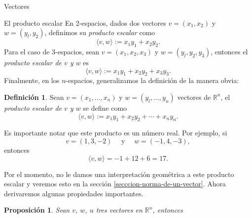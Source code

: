 \documentclass[a4paper,12pt,twoside,spanish,reqno]{amsbook}
\numberwithin{equation}{section}
\newtheorem{proposicion}[teorema]{Proposici\'on}
\theoremstyle{definition}
\newtheorem{definicion}[teorema]{Definici\'on}
\theoremstyle{remark}
\newcommand{\R}{\mathbb R}
\begin{document}
\begin{chapter}{Vectores}
\begin{section}{El producto escalar}
        En 2-espacios, dados dos vectores $v = (x_1, x_2)$ y $w= (y_l, y_2)$, definimos su \textit{producto escalar} como
        \begin{equation*}
            \langle v , w  \rangle :=x_1y_1 + x_2y_2.
        \end{equation*}
        Para el caso de 3-espacios, sean   $v = (x_1, x_2,x_3)$ y $w= (y_l, y_2,y_3)$,  entonces el \textit{producto escalar de $v$ y $w$} es
        \begin{equation*}
            \langle v , w  \rangle :=x_1y_1 + x_2y_2+x_3y_3.
        \end{equation*}
        Finalmente, en los $n$-espacios,  generalizamos la definición de la manera obvia: 
        
        \begin{definicion}
            Sean  $v = (x_1, \ldots,x_n)$ y $w= (y_l, \ldots,y_n)$ vectores de $\R^n$,  el \textit{producto escalar de $v$ y $w$} se define como		
            \begin{equation*}
            \langle v , w \rangle :=x_1y_1 + x_2y_2+\cdots+x_ny_n.
            \end{equation*}
        \end{definicion}
        
        
        
        Es importante notar  que este producto es un número real. Por ejemplo, si
        \begin{equation*}
            v= (1, 3, - 2) \quad\text{ y } \quad w= (- 1, 4, - 3),
        \end{equation*}
        entonces
        \begin{equation*}
            \langle v , w \rangle= - 1 + 12 + 6 = 17.
        \end{equation*}
        
        Por el momento, no le damos una interpretación geométrica a este producto escalar y veremos esto en la sección \ref{secccion-norma-de-un-vector}. Ahora derivaremos algunas propiedades importantes.
        
        \begin{proposicion}
           Sean $v$, $w$, $u$  tres vectores en $\R^n$, entonces
     

\end{proposicion}
\end{section}
\end{chapter}
\end{document}
